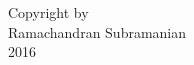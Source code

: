 \begin{center}
\null
\vfill
\begin{doublespace}
Copyright by \\ 
Ramachandran Subramanian \\ 
2016
\end{doublespace}
\end{center}
